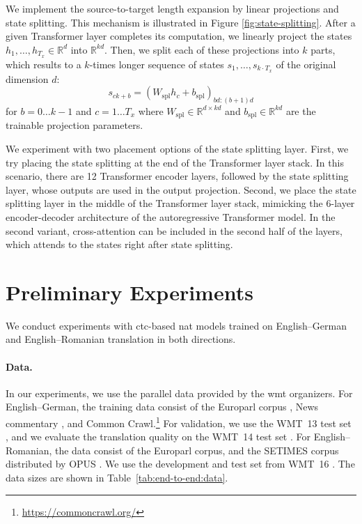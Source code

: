 We implement the source-to-target length expansion by linear projections and
state splitting. This mechanism is illustrated in Figure
\ref{fig:state-splitting}. After a given Transformer layer completes its
computation, we linearly project the states
$h_1, \ldots, h_{T_x} \in \mathbb{R}^d$ into $\mathbb{R}^{kd}$. Then, we split
each of these projections into $k$ parts, which results to a $k$-times longer
sequence of states $s_1, \ldots, s_{k \cdot T_x}$ of the original dimension
$d$:
%
\begin{equation}
  s_{ck+b} = \left( W_{\text{spl}} h_c + b_{\text{spl}} \right)_{bd:(b+1)d}
\end{equation}
%
for $b=0 \ldots k-1$ and $c=1 \ldots T_x$ where
$W_{\text{spl}} \in \mathbb{R}^{d \times kd}$ and
$b_{\text{spl}} \in \mathbb{R}^{kd}$ are the trainable projection parameters.

We experiment with two placement options of the state splitting layer. First,
we try placing the state splitting at the end of the Transformer layer
stack. In this scenario, there are 12 Transformer encoder layers, followed by
the state splitting layer, whose outputs are used in the output
projection. Second, we place the state splitting layer in the middle of the
Transformer layer stack, mimicking the 6-layer encoder-decoder architecture of
the autoregressive Transformer model. In the second variant, cross-attention
can be included in the second half of the layers, which attends to the states
right after state splitting.

\section{Preliminary Experiments}%
\label{sec:ctc:experiments}


We conduct experiments with \ac{ctc}-based \ac{nat} models trained on
English--German and English--Romanian translation in both directions.

\paragraph{Data.}
In our experiments, we use the parallel data provided by the \acs{wmt}
organizers. For English--German, the training data consist of the Europarl
corpus \citep{koehn-2005-europarl}, News commentary
\citep{tiedemann-2012-parallel}, and Common
Crawl.\footnote{\url{https://commoncrawl.org/}} For validation, we use the
WMT~13 test set \citep{bojar-etal-2013-findings}, and we evaluate the
translation quality on the WMT~14 test set
\citep{bojar-etal-2014-findings}. For English--Romanian, the data consist of
the Europarl corpus, and the SETIMES corpus distributed by OPUS
\citep{tiedemann-2012-parallel}. We use the development and test set from
WMT~16 \citep{bojar-etal-2016-findings}. The data sizes are shown in
Table~\ref{tab:end-to-end:data}.

